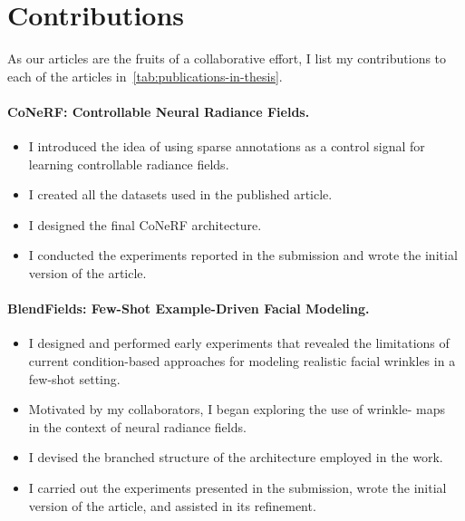 {%


\section*{Contributions}
  As our articles are the fruits of a collaborative effort, I list my
  contributions to each of the articles in~\cref{tab:publications-in-thesis}.

  \paragraph{CoNeRF: Controllable Neural Radiance Fields.}
    \begin{itemize}
      \item I introduced the idea of using sparse annotations as a control signal
            for learning controllable radiance fields.
      \item I created all the datasets used in the published article.
      \item I designed the final CoNeRF architecture.
      \item I conducted the experiments reported in the submission and wrote the
            initial version of the article.
    \end{itemize}

  \paragraph{BlendFields: Few-Shot Example-Driven Facial Modeling.}
    \begin{itemize}
      \item I designed and performed early experiments that revealed the
            limitations of current condition-based approaches for modeling realistic
            facial wrinkles in a few-shot setting.
      \item Motivated by my collaborators, I began exploring the use of wrinkle-
            maps~\cite{oat2007animated} in the context of neural radiance fields.
      \item I devised the branched structure of the architecture employed in the work.
      \item I carried out the experiments presented in the submission, wrote the
            initial version of the article, and assisted in its refinement.
    \end{itemize}

}
